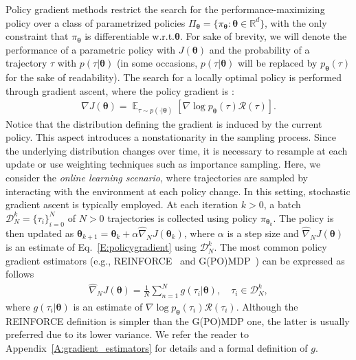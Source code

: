 \documentclass{article}
\makeatletter
\theoremstyle{remark}
\theoremstyle{definition}
\DeclareRobustCommand{\eg}{e.g.,\@\xspace}
\DeclareRobustCommand{\wrt}{w.r.t.\@\xspace}
\newcommand{\realspace}{\mathbb R}      %
\DeclareMathOperator*{\EV}{\mathbb{E}}
\newcommand{\EVV}[2][\ppvect \in \ppspace]{\EV_{#1}\left[{#2}\right]}
\newcommand{\de}{\,\mathrm{d}}
\newcommand{\vtheta}{\boldsymbol{\theta}}
\newcommand{\Tspace}{\mathcal{T}}
\newcommand{\Reward}{\mathcal{R}}
\newcommand{\pol}{\pi_{\vtheta}}
\newcommand{\score}[2]{\nabla\log p_{#1}(#2)}
\newcommand{\gradJ}[1]{\nabla J(#1)}
\newcommand{\gradApp}[2]{\widehat{\nabla}_{#2}J(#1)}
\makeatother
\begin{document}
Policy gradient methods restrict the search for the performance-maximizing policy over a class of parametrized policies $\Pi_{\vtheta}=\{\pol: \vtheta \in \realspace^d\}$, with the only constraint that $\pol$ is differentiable \wrt $\vtheta$. For sake of brevity, we will denote the performance of a parametric policy with $J(\vtheta)$ and the probability of a trajectory $\tau$ with $p(\tau|\vtheta)$ (in some occasions, $p(\tau|\vtheta)$ will be replaced by $p_{\vtheta}(\tau)$ for the sake of readability).
The search for a locally optimal policy is performed through gradient ascent, where the policy gradient
is \cite{sutton2000policy, Peters2008reinf}:
\begin{align} \label{E:policygradient}
        \gradJ{\vtheta} = \EVV[\tau \sim p(\cdot|\vtheta)]{\score{\vtheta}{\tau}\Reward(\tau)}.
\end{align}
Notice that the distribution defining the gradient is induced by the current policy. This aspect introduces a nonstationarity in the sampling process. Since the underlying distribution changes over time, it is necessary to resample at each update or use weighting techniques such as importance sampling.
Here, we consider the \emph{online learning scenario}, where trajectories are sampled by interacting with the environment at each policy change. 
In this setting, stochastic gradient ascent is typically employed.
At each iteration $k >0$, a batch $\mathcal{D}_N^k = \{\tau_i\}_{i=0}^N$ of $N>0$ trajectories is collected using policy $\pi_{\vtheta_k}$.
The policy is then updated as $\vtheta_{k+1}  = \vtheta_k + \alpha\gradApp{\vtheta_k}{N}$, where $\alpha$ is a step size and $\gradApp{\vtheta}{N}$ is an estimate of Eq.~\eqref{E:policygradient} using $\mathcal{D}_N^k$. The most common policy gradient estimators (\eg REINFORCE~\citep{williams1992simple} and G(PO)MDP~\citep{baxter2001infinite}) can be expressed as follows
\begin{align} \label{E:policygradient.estimate}
        \gradApp{\vtheta}{N} = \frac{1}{N}\sum_{n=1}^{N} g(\tau_i|\vtheta), \quad \tau_i \in \mathcal{D}_N^k,
\end{align}
where $g(\tau_i|\vtheta)$ is an estimate of $\score{\vtheta}{\tau_i}\Reward(\tau_i)$.
Although the REINFORCE definition is simpler than the G(PO)MDP one, the latter is usually preferred due to its lower variance.
We refer the reader to Appendix~\ref{A:gradient_estimators} for details and a formal definition of $g$.
\end{document}
